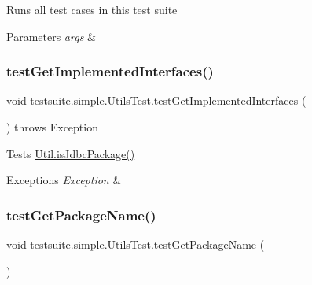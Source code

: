 Runs all test cases in this test suite


\begin{DoxyParams}{Parameters}
{\em args} & \\
\hline
\end{DoxyParams}
\mbox{\label{classtestsuite_1_1simple_1_1_utils_test_a173e24f02866b3c9a9356d28077db9b3}} 
\subsubsection{\texorpdfstring{test\+Get\+Implemented\+Interfaces()}{testGetImplementedInterfaces()}}
{\footnotesize\ttfamily void testsuite.\+simple.\+Utils\+Test.\+test\+Get\+Implemented\+Interfaces (\begin{DoxyParamCaption}{ }\end{DoxyParamCaption}) throws Exception}

Tests \mbox{\hyperlink{classcom_1_1mysql_1_1cj_1_1util_1_1_util_a4ff66f7ccc05ec9631b13bb5e9e9fbbe}{Util.\+is\+Jdbc\+Package()}}


\begin{DoxyExceptions}{Exceptions}
{\em Exception} & \\
\hline
\end{DoxyExceptions}
\mbox{\label{classtestsuite_1_1simple_1_1_utils_test_a15e2df447f329b76ef2115f6583296c0}} 
\subsubsection{\texorpdfstring{test\+Get\+Package\+Name()}{testGetPackageName()}}
{\footnotesize\ttfamily void testsuite.\+simple.\+Utils\+Test.\+test\+Get\+Package\+Name (\begin{DoxyParamCaption}{ }\end{DoxyParamCaption})}


